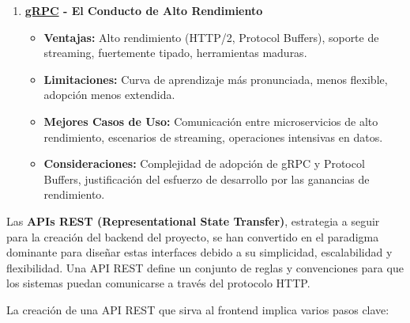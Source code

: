 \begin{enumerate}
    \item \textbf{\hyperlink{grpc}{gRPC} - El Conducto de Alto Rendimiento}
    \begin{itemize}
        \item \textbf{Ventajas:} Alto rendimiento (HTTP/2, Protocol Buffers), soporte de streaming, fuertemente tipado, herramientas maduras.
        \item \textbf{Limitaciones:} Curva de aprendizaje más pronunciada, menos flexible, adopción menos extendida.
        \item \textbf{Mejores Casos de Uso:} Comunicación entre microservicios de alto rendimiento, escenarios de streaming, operaciones intensivas en datos.
        \item \textbf{Consideraciones:} Complejidad de adopción de gRPC y Protocol Buffers, justificación del esfuerzo de desarrollo por las ganancias de rendimiento.
    \end{itemize}
\end{enumerate}

Las \textbf{APIs REST (Representational State Transfer)}, estrategia a seguir para la creación del backend del proyecto, se han convertido en el paradigma dominante para dise\~{n}ar estas interfaces debido a su simplicidad, escalabilidad y flexibilidad. Una API REST define un conjunto de reglas y convenciones para que los sistemas puedan comunicarse a trav\'{e}s del protocolo HTTP.

La creaci\'{o}n de una API REST que sirva al frontend implica varios pasos clave:

